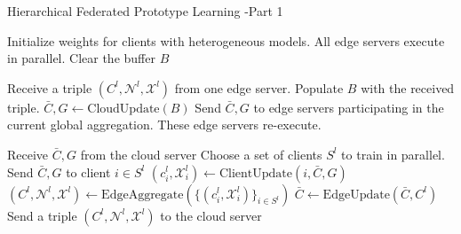 \documentclass[journal]{IEEEtran}
\begin{document}
\begin{algorithm}[H]
  \caption{Hierarchical Federated Prototype Learning -Part 1}
  \begin{algorithmic}[1]

    \State Initialize weights for clients with heterogeneous models.
    \State All edge servers execute in parallel.
    \State Clear the buffer \(B\)

     
    \State Receive a triple \( (C^l, \mathcal{N}^l, \mathcal{X}^l) \) from one edge server.
    \State Populate \( B \) with the received triple.
    \EndWhile
    \State \( \bar{C}, G \gets \text{CloudUpdate}(B) \)
    \State Send \( \bar{C}, G \) to edge servers participating in the current global aggregation.
    \State These edge servers re-execute.
    \EndFor
    \EndProcedure

    \State Receive \( \bar{C}, G \) from the cloud server
    \State Choose a set of clients $S^l$ to train in parallel.
     
    \State Send \( \bar{C}, G \) to client \( i \in S^{l} \)
    \State \( (c^l_i, \mathcal{X}^l_i) \gets \text{ClientUpdate}(i, \bar{C}, G) \)
    \EndFor {}
    \State \( (C^l, \mathcal{N}^l, \mathcal{X}^l) \gets \text{EdgeAggregate}(\{ (c^l_i, \mathcal{X}^l_i) \}_{i \in S^{l}}) \)
    \State \( \bar{C} \gets \text{EdgeUpdate}(\bar{C}, C^l) \) 
    \EndFor
    \State Send a triple \( (C^l, \mathcal{N}^l, \mathcal{X}^l) \) to the cloud server
    \EndProcedure
  \end{algorithmic}
\end{algorithm}

\end{document}
